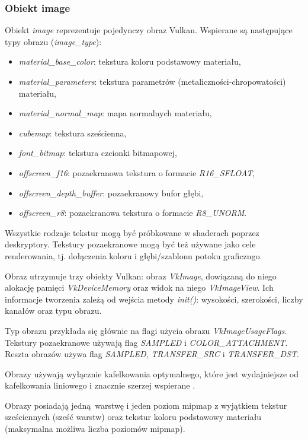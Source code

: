 \subsubsection{Obiekt image}
Obiekt \textit{image} reprezentuje pojedynczy obraz Vulkan.
Wspierane są następujące typy obrazu (\textit{image\_type}):
\begin{itemize}
	\item \textit{material\_base\_color}: tekstura koloru podstawowy materiału,
	\item \textit{material\_parameters}: tekstura parametrów (metaliczności-chropowatości) materiału,
	\item \textit{material\_normal\_map}: mapa normalnych materiału,
	\item \textit{cubemap}: tekstura sześcienna,
	\item \textit{font\_bitmap}: tekstura czcionki bitmapowej,
	\item \textit{offscreen\_f16}: pozaekranowa tekstura o formacie \textit{R16\_SFLOAT},
	\item \textit{offscreen\_depth\_buffer}: pozaekranowy bufor głębi,
	\item \textit{offscreen\_r8}: pozaekranowa tekstura o formacie \textit{R8\_UNORM}.
\end{itemize}

Wszystkie rodzaje tekstur mogą być próbkowane w shaderach poprzez deskryptory.
Tekstury pozaekranowe mogą być też używane jako cele renderowania, tj. dołączenia koloru i głębi/szablonu potoku graficzngo.

Obraz utrzymuje trzy obiekty Vulkan: obraz \textit{VkImage}, dowiązaną do niego alokację pamięci \textit{VkDeviceMemory} oraz widok na niego \textit{VkImageView}.
Ich informacje tworzenia zależą od wejścia metody \textit{init()}: wysokości, szerokości, liczby kanałów oraz typu obrazu.

Typ obrazu przykłada się głównie na flagi użycia obrazu \textit{VkImageUsageFlags}.
Tekstury pozaekranowe używają flag \textit{SAMPLED} i \textit{COLOR\_ATTACHMENT}.
Reszta obrazów używa flag \textit{SAMPLED}, \textit{TRANSFER\_SRC} i \textit{TRANSFER\_DST}.

Obrazy używają wyłącznie kafelkowania optymalnego, które jest wydajniejsze od kafelkowania liniowego i znacznie szerzej wspierane \cite{GPUINFO}.

Obrazy posiadają jedną warstwę i jeden poziom mipmap z wyjątkiem tekstur sześciennych (sześć warstw) oraz tekstur koloru podstawowy materiału (maksymalna możliwa liczba poziomów mipmap).

